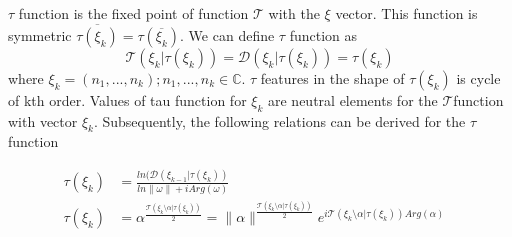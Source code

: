 \begin{definition}
        \(\tau\) function is the fixed point of function \(\mathcal{T}\) with the 
        \(\xi\) vector. This function is symmetric \(\overline{\tau(\xi_k)}=\tau(\overline{\xi_k})\).
        We can define \(\tau\) function as \[\mathcal{T}(\xi_k | \tau(\xi_k)) = \mathcal{D}(\xi_k | 
        \tau(\xi_k)) = \tau(\xi_k)\] where \(\xi_k = (n_1, ..., n_k); n_1, ..., n_k \in 
        \mathbb{C}\). \(\tau\) features in the shape of \(\tau(\xi_k)\) is cycle of kth order. 
        Values of tau function for \(\xi_k\) are neutral elements for the \(\mathcal{T}\)function with vector \(\xi_k\). 
        Subsequently, the following relations can be derived for the \(\tau\) function

        \begin{align}
                \tau(\xi_k) &= \frac{ln(\mathcal{D}(\xi_{k-1}|\tau(\xi_k))}{ln\|\omega\| + iArg(\omega)} & \\
                \tau(\xi_k) &= \alpha^{\frac{\mathcal{T}(\xi_k \setminus \alpha | \tau(\xi_k))}{2}}= 
                \|\alpha\|^{\frac{\mathcal{T}(\xi_k \setminus \alpha | \tau(\xi_k))}{2}} e^{i\mathcal{T}(\xi_k
                \setminus \alpha | \tau(\xi_k))Arg(\alpha)} 
                \label{4}
        \end{align}

\end{definition}
